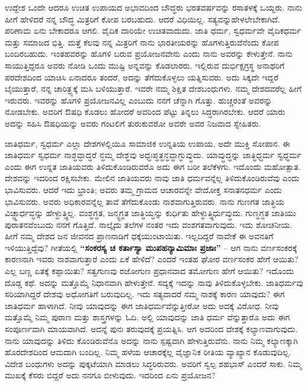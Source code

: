 ಉದ್ದೇಶ ಒಂದೇ ಆದರೂ ಉಚಿತ ಉಪಾಯದ ಅಭಾವದಿಂದ ಬೌದ್ಧರು ಭರತವರ್ಷವನ್ನು ರಸಾತಳಕ್ಕೆ ಒಯ್ದರು. ನಾನು ಹೀಗೆ ಹೇಳಿದರೆ ನನ್ನ ಬೌದ್ಧ ಮಿತ್ರರಿಗೆ ಕೋಪ ಬರಬಹುದು. ಆದರೆ ವಿಧಿಯಿಲ್ಲ. ಸತ್ಯವನ್ನುಹೇಳಲೇಬೇಕಾಗಿದೆ. ಪರಿಣಾಮ ಏನು ಬೇಕಾದರೂ ಆಗಲಿ. ವೈದಿಕ ದಾರಿಯೇ ಉಚಿತವಾದುದು. ಜಾತಿ ಧರ್ಮ, ಸ್ವಧರ್ಮವೇ ವೈದಿಕಧರ್ಮ ಮತ್ತು ಸಮಾಜದ ಭಿತ್ತಿ. ಮತ್ತೆ ಕೆಲವು ನನ್ನ ಮಿತ್ರರಿಗೆ ನಾನು ಭಾರತೀಯರನ್ನು ಹೊಗಳುತ್ತಿರುವೆನೆಂದು ಕೋಪ ಬಂದಿರಬಹುದು. ಇಂತಹವರನ್ನು ಹೊಗಳಿ ಬರುವ ಪ್ರಯೋಜನವೇನು ಎಂದು ನಾನು ಅವರನ್ನು ಕೇಳುತ್ತೇನೆ. ನಾನು ಸಾಯುತ್ತಿದ್ದರೂ ಅವರು ನೋಡಿ ಒಂದು ಮುಷ್ಟಿ ಅನ್ನವನ್ನು ಕೊಡಲಾರರು. ಇಲ್ಲಿರುವ ದುರ್ಭಿಕ್ಷಗ್ರಸ್ಥ ಅನಾಥರಿಗೆ ಪರದೇಶದಿಂದ ಯಾಚಿಸಿ ಏನಾದರೂ ತಂದರೆ, ಅದನ್ನು ತೆಗೆದುಕೊಳ್ಳಲು ಯತ್ನಿಸುವರು. ಅದು ಸಿಕ್ಕದೇ ಇದ್ದರೆ ಬೈಯುತ್ತಾರೆ, ನನ್ನ ಚಾರಿತ್ರ್ಯಕ್ಕೆ ಮಸಿ ಬಳಿಯುತ್ತಾರೆ. ಇವರೇ ನಮ್ಮ ಶಿಕ್ಷಿತ ದೇಶಬಂಧುಗಳು. ನಮ್ಮ ದೇಶದವರೆಲ್ಲ ಹೀಗೆ ಇರುವರು. ಇವರನ್ನು ಹೊಗಳಿ ಪ್ರಯೋಜನವಿಲ್ಲ ಎಂಬುದು ನನಗೆ ಚೆನ್ನಾಗಿ ಗೊತ್ತು. ಹುಚ್ಚರಂತೆ ಅವರನ್ನು ನೋಡಬೇಕು. ಅವರಿಗೆ ಔಷಧಿ ಕೊಡಲು ಹೋದರೆ ಅವರಿಂದ ಪೆಟ್ಟು ತಿನ್ನಲು ಸಿದ್ಧರಾಗಿರಬೇಕು. ಆದರೆ ಯಾರು ಅದನ್ನು ಸಹಿಸಿ ಔಷಧಿಯನ್ನು ಅವರು ಗಂಟಲಿಗೆ ತುರುಕುವರೋ ಅವರೇ ಅವರ ನಿಜವಾದ ಸ್ನೇಹಿತರು.

ಜಾತಿಧರ್ಮ, ಸ್ವಧರ್ಮ ಎಲ್ಲಾ ದೇಶಗಳಲ್ಲಿಯೂ ಸಾಮಾಜಿಕ ಉನ್ನತಿಯ ಉಪಾಯ, ಅದೇ ಮುಕ್ತಿ ಸೋಪಾನ. ಈ ಜಾತಿಧರ್ಮ ಸ್ವಧರ್ಮ ನಾಶ್ಧವ್ಧಾದ್ಧರೆ ನ್ಧಮ್ಮ ದೇಶ್ಧವು ಅಧ್ಧಃಪ್ಧತ್ಧನ್ಧವ್ಧಾಗ್ಧುವ್ಧುದು. ಯಾವ್ಧುದ್ಧನ್ನು ಜಾತ್ಧಿಧ್ಧರ್ಮ ಸ್ವಧ್ಧರ್ಮ ಎಂದು ಈಗ ಉನ್ನತ ಜಾತಿಯವರು ತಿಳಿದುಕೊಂಡಿರುವರೊ ಅದು ಈಗ ಬರೀ ತಲೆಕೆಳಗು. ಇದೊಂದು ಮಹೋತ್ಪಾತ. ದೇಶವನ್ನು ಇದರಿಂದ ರಕ್ಷಿಸಬೇಕು. ಮೇಲಿನ ಜಾತಿಯವರು ನಾವು ಜಾತಿ ಧರ್ಮವನ್ನೆಲ್ಲ ತಿಳಿದುಕೊಂಡಿರುವೆವು ಎಂದು ಭಾವಿಸುವರು. ಆದರೆ ಇದು ಭ್ರಾಂತಿ; ಅವರು ತಮ್ಮ ಗ್ರಾಮದ ಆಚಾರವನ್ನೇ ವೇದೋಕ್ತ ಸನಾತನಧರ್ಮ ಎಂದು ಭಾವಿಸುವರು. ಅವರು ಅಧಿಕಾರವನ್ನೆಲ್ಲ ತಾವೆ ತೆಗೆದುಕೊಂಡು ನಾಶವಾಗುತ್ತಿರುವರು. ನಾನು ಗುಣಗತ ಜಾತ್ಧಿಯ ವಿಚ್ಧ್ಧಾರ್ಧವ್ಧನ್ನು ಹೇಳ್ಧುತ್ತ್ಧಿಲ್ಲ. ವಂಶ್ಧಗ್ಧತ, ಜನ್ಮ್ಧಗ್ಧತ ಜಾತ್ಧಿಯ್ಧನ್ನು ಕುರ್ಧಿತು ಹೇಳ್ಧುತ್ತ್ಧಿರ್ಧುವ್ಧುದು. ಗುಣ್ಧಗ್ಧತ ಜಾತಿಯು ಪುರಾತನವೆಂಬುದು ನನಗೆ ಗೊತ್ತಿದೆ. ನಾಲ್ಕೈದು ತಲೆಗಳ ನಂತರ ಇದು ವಂಶಗತವಾಗುವುದು. ಇದು ಶೋಚನೀಯ. ಹೀಗೆ ನಮ್ಮ ದೇಶದ ಜನ ಜೀವನದ ಪ್ರಾಣನಾಡಿಗೆ ಧಕ್ಕೆಯುಂಟಾಯಿತು. ಇಲ್ಲದಿದ್ದರೆ ನಾವೇಕೆ ಈ ಅವನತಿಗೆ ಇಳಿಯುತ್ತಿದ್ದೆವು? ಗೀತೆಯಲ್ಲಿ \textbf{“ಸಂಕರಸ್ಯ ಚ ಕರ್ತಾಸ್ಯಾ ಮುಪಹನ್ಯಾಮಿಮಾಃ ಪ್ರಜಾಃ”} – ಆಗ ನಾನು ವರ್ಣಸಂಕರಕ್ಕೆ ಕಾರಣನಾಗಿ ಇವರು ನಾಶವಾಗುತ್ತಾರೆ ಎಂದು ಏಕೆ ಹೇಳಿದೆ? ಎಂದರೆ ಇಂತಹ ಘೋರ ವರ್ಣಸಂಕರ ಹೇಗೆ ಆಯಿತು? ಎಲ್ಲ ಬಣ್ಣ ಏತಕ್ಕೆ ಕಪ್ಪಾಯಿತು? ಸತ್ವಗುಣವು ರಜೋಗುಣ ಪ್ರಧಾನವಾದ ತಮೋಗುಣ ಹೇಗೆ ಆಯಿತು? ಇದೊಂದು ದೊಡ್ಡ ಕಥೆ. ಅದನ್ನು ಮತ್ತೊಮ್ಮೆ ನಿಧಾನವಾಗಿ ಹೇಳುತ್ತೇನೆ. ಸದ್ಯಕ್ಕೆ ಇದನ್ನು ನಾವು ತಿಳಿದುಕೊಳ್ಳಬೇಕು. ಜಾತಿಧರ್ಮವು ಸರಿಯಾಗಿದ್ದರೆ ದೇಶವು ಅಧೋಗತಿಗೆ ಬರುವುದಿಲ್ಲ. ಇದು ಸತ್ಯವಾದರೆ ನಮ್ಮ ನಾಶಕ್ಕೆ ಕಾರಣ ಯಾವುದು? ಈಗ ಜಾತಿಧರ್ಮ ಹಾಳಾಗಿದೆ. ನೀವು ಯಾವುದನ್ನು ಈಗ ಜಾತಿಧರ್ಮವೆನ್ನುತ್ತೀರೋ ಅದು ಅದಕ್ಕೆ ವಿರೋಧ. ನೀವು ಮತ್ತೊಮ್ಮೆ ನಿಮ್ಮ ಪುರಾಣ ಮತ್ತು ಶಾಸ್ತ್ರಗಳನ್ನು ಓದಿ. ಅಲ್ಲಿ ಯಾವುದನ್ನು ಜಾತಿ ಧರ್ಮ ವೆನ್ನುತ್ತಾರೊ ಅದು ಈಗ ಸಂಪೂರ್ಣವಾಗಿ ಮಾಯವಾಗಿದೆ. ಅದನ್ನೆ ಪುನಃ ತರುವುದಕ್ಕೆ ಪ್ರಯತ್ನಿಸಿ. ಆಗ ಅದರಿಂದ ದೇಶಕ್ಕೆ ಕಲ್ಯಾಣವಾಗುವುದು. ನಾನು ಯಾವುದನ್ನು ತಿಳಿದು ಕೊಂಡಿರುವೆನೊ ಅದನ್ನು ನಾನು ಸ್ಪಷ್ಟವಾಗಿ ಹೇಳುತ್ತಿರುವೆನು. ನಾನು ನಿಮ್ಮ ಕಲ್ಯಾಣಕ್ಕಾಗಿ ಹೊರದೇಶದಿಂದ ಆಮದಾಗಿ ಬಂದಿಲ್ಲ. ನಿಮ್ಮ ಹಳೆಯ ಆಚಾರಕ್ಕೆಲ್ಲ ವೈಜ್ಞಾನಿಕ ರೀತಿಯ ವ್ಯಾಖ್ಯಾನ ಕೊಡುವುದಿಲ್ಲ. ವಿದೇಶ ಬಂಧುಗಳು ಅದನ್ನು ಪುಕ್ಕಟೆಯಾಗಿ ಮಾಡಲು ಸಿದ್ಧರಿರುವರು. ಅವರಿಗೆ ಸ್ವಲ್ಪ ಶಹಭಾಸ್​ ಎಂದರೆ ಸಾಕು. ನಿಮ್ಮ ಮುಖಕ್ಕೆ ಕೆಸರು ಬಿದ್ದರೆ ಅದು ನನಗೂ ಬೀಳುವುದು. ಇದರಿಂದ ಏನು ಪ್ರಯೋಜನ?

